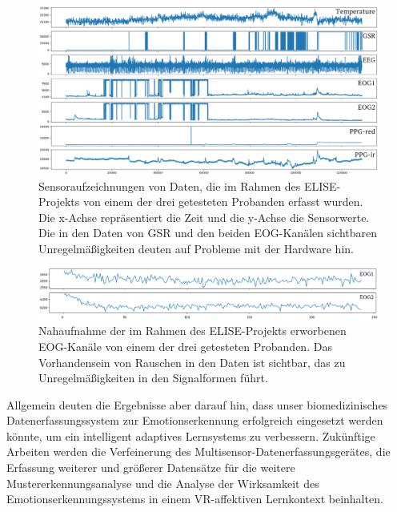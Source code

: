 \begin{figure}[h]
\includegraphics[width=\textwidth]{Images/bad_signals.png} 
\vspace{-0.3cm} \caption[Sensoraufzeichnungen von Daten]{ Sensoraufzeichnungen von Daten, die im Rahmen des ELISE-Projekts von einem der drei getesteten Probanden erfasst wurden. Die x-Achse repräsentiert die Zeit und die y-Achse die Sensorwerte. Die in den Daten von GSR und den beiden EOG-Kanälen sichtbaren Unregelmäßigkeiten deuten auf Probleme mit der Hardware hin. }
\label{fig:bad_signals} \end{figure} \vspace{0.5cm}


\begin{figure}[h]
\includegraphics[width=\textwidth]{Images/zoom.png} 
\vspace{-0.3cm} \caption[Nahaufnahme von Rauschen in Daten]{ Nahaufnahme der im Rahmen des ELISE-Projekts erworbenen EOG-Kanäle von einem der drei getesteten Probanden. Das Vorhandensein von Rauschen in den Daten ist sichtbar, das zu Unregelmäßigkeiten in den Signalformen führt. }
\label{fig:zoom} \end{figure} \vspace{0.5cm}



\newpage

Allgemein deuten die Ergebnisse aber darauf hin, dass unser biomedizinisches Datenerfassungssystem zur Emotionserkennung erfolgreich eingesetzt werden könnte, um ein intelligent adaptives Lernsystems zu verbessern. Zukünftige Arbeiten werden die Verfeinerung des Multisensor-Datenerfassungsgerätes, die Erfassung weiterer und größerer Datensätze für die weitere Mustererkennungsanalyse und die Analyse der Wirksamkeit des Emotionserkennungssystems in einem VR-affektiven Lernkontext beinhalten.